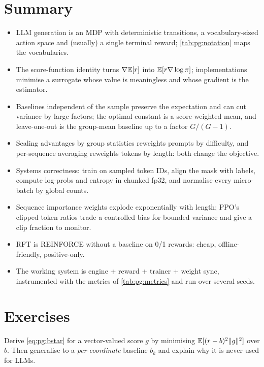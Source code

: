 \section{Summary}\label{sec:pg:summary}
\begin{itemize}
\item LLM generation is an MDP with deterministic transitions, a vocabulary-sized action space
  and (usually) a single terminal reward; \cref{tab:pg:notation} maps the vocabularies.
\item The score-function identity turns $\nabla\mathbb{E}[r]$ into $\mathbb{E}[r\nabla\log\pi]$; implementations
  minimise a surrogate whose value is meaningless and whose gradient is the estimator.
\item Baselines independent of the sample preserve the expectation and can cut variance by
  large factors; the optimal constant is a score-weighted mean, and leave-one-out is the
  group-mean baseline up to a factor $G/(G-1)$.
\item Scaling advantages by group statistics reweights prompts by difficulty, and per-sequence
  averaging reweights tokens by length: both change the objective.
\item Systems correctness: train on sampled token IDs, align the mask with labels, compute
  log-probs and entropy in chunked fp32, and normalise every micro-batch by global counts.
\item Sequence importance weights explode exponentially with length; PPO's clipped token ratios
  trade a controlled bias for bounded variance and give a clip fraction to monitor.
\item RFT is REINFORCE without a baseline on 0/1 rewards: cheap, offline-friendly, positive-only.
\item The working system is engine + reward + trainer + weight sync, instrumented with the
  metrics of \cref{tab:pg:metrics} and run over several seeds.
\end{itemize}

\section{Exercises}\label{sec:pg:exercises}

\begin{exercise}
Derive \cref{eq:pg:bstar} for a vector-valued score $g$ by minimising
$\mathbb{E}[(r-b)^2\|g\|^2]$ over $b$. Then generalise to a \emph{per-coordinate} baseline $b_k$ and
explain why it is never used for LLMs.
\end{exercise}

